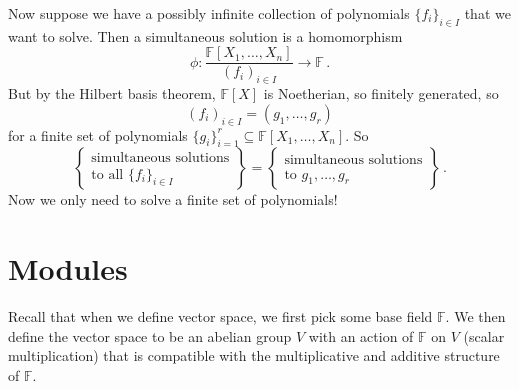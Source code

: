 \documentclass{article}
\theoremstyle{plain}\theoremheaderfont{\normalfont\itshape}\theorembodyfont{\rmfamily}\theoremseparator{.}\newtheorem*{rem}{Remark}\newtheorem*{ex}{Example}\newtheorem*{proof}{Proof}\newtheorem*{altp}{Alternative proof}\newtheorem*{nonex}{Non-Example}
\theoremstyle{plain}\theoremheaderfont{\normalfont\bfseries}\theorembodyfont{\rmfamily}\theoremseparator{.}\newtheorem{thm}{Theorem}[section]\newtheorem{lem}[thm]{Lemma}\newtheorem{prop}[thm]{Proposition}\newtheorem*{cor}{Corollary}\newtheorem{defn}[thm]{Definition}\newtheorem{clm}[thm]{Claim}\newtheorem{clminproof}{Claim}\newtheorem*{notn}{Notation}\newtheorem*{exer}{Exercise}\newtheorem*{lemnn}{Lemma}
\theoremstyle{break}\theoremheaderfont{\normalfont\itshape}\theorembodyfont{\rmfamily}\theoremseparator{.\medskip}\newtheorem*{proofskip}{Proof}\newtheorem*{exs}{Examples}\newtheorem*{rems}{Remarks}\newtheorem*{obs}{Observations}
\theoremstyle{break}\theoremheaderfont{\normalfont\bfseries}\theorembodyfont{\rmfamily}\theoremseparator{.\medskip}\newtheorem{lemskip}[thm]{Lemma}\newtheorem{defnskip}[thm]{Definition}\newtheorem{propskip}[thm]{Proposition}\newtheorem{thmskip}[thm]{Theorem}
\numberwithin{equation}{section}
\newcommand{\FF}{\mathbb{F}}
\begin{document}
    Now suppose we have a possibly infinite collection of polynomials \(\{f_i\}_{i\in I}\) that we want to solve. Then a simultaneous solution is a homomorphism
    \[\phi:\frac{\FF[X_1,\dots,X_n]}{(f_i)_{i\in I}}\to\FF\,.\]
    But by the Hilbert basis theorem, \(\FF[X]\) is Noetherian, so finitely generated, so
    \[(f_i)_{i\in I}=(g_1,\dots,g_r)\]
    for a finite set of polynomials \(\{g_i\}_{i=1}^{r}\subseteq\FF[X_1,\dots,X_n]\). So
    \[\left\{\begin{matrix}
        \text{simultaneous solutions}\\\text{to all \(\{f_i\}_{i\in I}\)}
    \end{matrix}\right\}=\left\{\begin{matrix}
        \text{simultaneous solutions}\\\text{to \(g_1,\dots,g_r\)}
    \end{matrix}\right\}\,.\]
    Now we only need to solve a finite set of polynomials!

    \newpage
    \section{Modules}
    Recall that when we define vector space, we first pick some base field \(\FF\). We then define the vector space to be an abelian group \(V\) with an action of \(\FF\) on \(V\) (scalar multiplication) that is compatible with the multiplicative and additive structure of \(\FF\).
\end{document}
